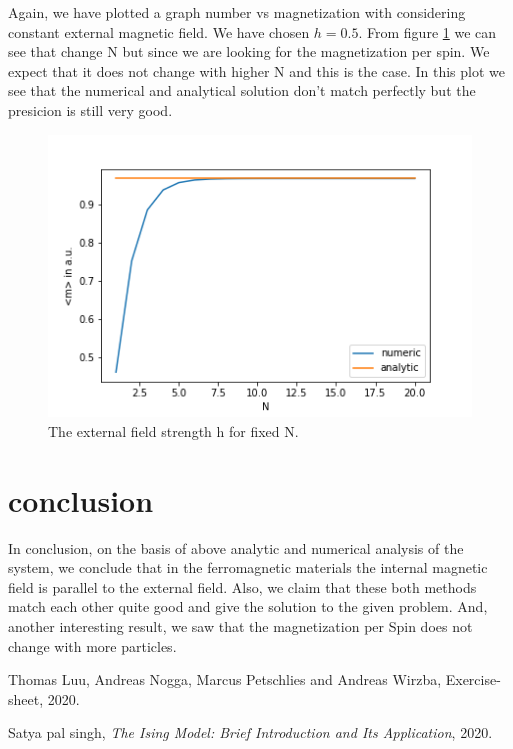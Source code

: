 \documentclass[11pt, a4paper, DIV=12]{scrartcl}
\begin{document}
Again, we have plotted a graph number vs magnetization with considering constant external magnetic field. We have chosen $h= 0.5$. From figure \ref{fig:hconst} we can see that change N but since we are looking for the magnetization per spin. We expect that it does not change with higher N and this is the case. In this plot we see that the numerical and analytical solution don't match perfectly but the presicion is still very good. 
   \begin{figure}[H]
   	\centering
   	\includegraphics[width=0.8\linewidth]{hconst.png}
   	\caption{The external field strength h for fixed N.}
   	\label{fig:hconst}
   \end{figure}
\section{conclusion}
In conclusion, on the basis of above analytic and numerical analysis of the system, we conclude that in the ferromagnetic materials the internal magnetic field is parallel to the external field. Also, we claim that these both methods match each other quite good and give the solution to the given problem. And, another interesting result, we saw that the magnetization per Spin does not change with more particles.  
\begin{thebibliography}{12}
	Thomas Luu, Andreas Nogga, Marcus Petschlies and  Andreas Wirzba, Exercise-sheet, 2020. 
		
	Satya pal singh, \textit{The Ising Model: Brief Introduction and Its Application}, 2020.
	
\end{thebibliography}
\end{document}
